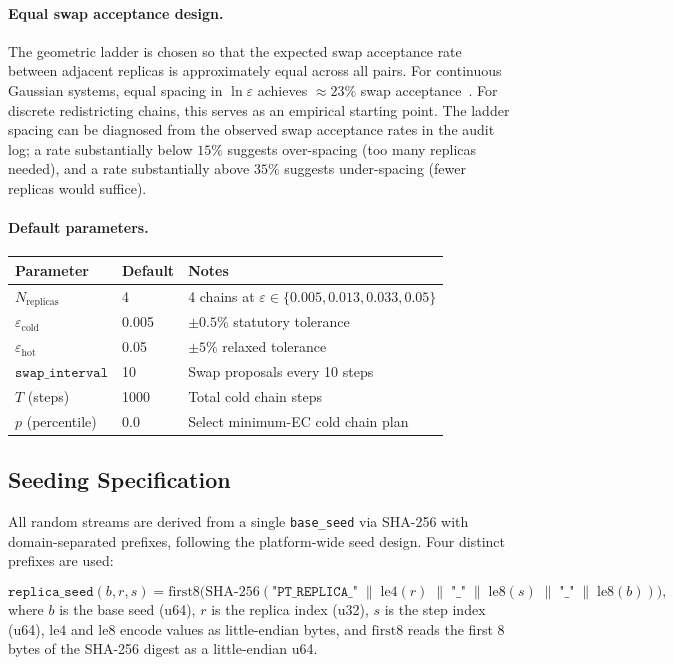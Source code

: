 \paragraph{Equal swap acceptance design.}
The geometric ladder is chosen so that the expected swap acceptance rate between
adjacent replicas is approximately equal across all pairs.
For continuous Gaussian systems, equal spacing in $\ln\varepsilon$ achieves
${\approx}23\%$ swap acceptance~\citep{kone2005}.
For discrete redistricting chains, this serves as an empirical starting point.
The ladder spacing can be diagnosed from the observed swap acceptance rates in
the audit log; a rate substantially below $15\%$ suggests over-spacing
(too many replicas needed), and a rate substantially above $35\%$ suggests
under-spacing (fewer replicas would suffice).

\paragraph{Default parameters.}
\begin{center}
\renewcommand{\arraystretch}{1.25}
\begin{tabular}{@{}lll@{}}
\toprule
Parameter & Default & Notes \\
\midrule
$N_{\mathrm{replicas}}$ & 4 & 4 chains at $\varepsilon \in \{0.005, 0.013, 0.033, 0.05\}$ \\
$\varepsilon_{\mathrm{cold}}$ & 0.005 & $\pm 0.5\%$ statutory tolerance \\
$\varepsilon_{\mathrm{hot}}$ & 0.05 & $\pm 5\%$ relaxed tolerance \\
$\mathtt{swap\_interval}$ & 10 & Swap proposals every 10 steps \\
$T$ (steps) & 1000 & Total cold chain steps \\
$p$ (percentile) & 0.0 & Select minimum-EC cold chain plan \\
\bottomrule
\end{tabular}
\end{center}

\subsection{Seeding Specification}
\label{sec:seeding}

All random streams are derived from a single \texttt{base\_seed} via SHA-256
with domain-separated prefixes, following the platform-wide seed design.
Four distinct prefixes are used:

\begin{definition}
\label{def:replica-seed}
\[
  \mathtt{replica\_seed}(b, r, s) =
  \mathrm{first8}\bigl(\mathrm{SHA\text{-}256}(
    \texttt{"PT\_REPLICA\_"} \;\|\;
    \mathrm{le4}(r) \;\|\;
    \texttt{"\_"} \;\|\;
    \mathrm{le8}(s) \;\|\;
    \texttt{"\_"} \;\|\;
    \mathrm{le8}(b)
  )\bigr),
\]
where $b$ is the base seed (u64), $r$ is the replica index (u32), $s$ is the
step index (u64), $\mathrm{le4}$ and $\mathrm{le8}$ encode values as little-endian bytes,
and $\mathrm{first8}$ reads the first 8 bytes of the SHA-256 digest as a
little-endian u64.
\end{definition}

